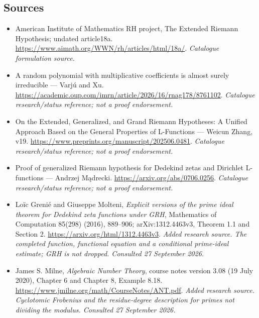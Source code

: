 \documentclass[11pt,a4paper]{article}
\begin{document}
\subsection{Sources}
\begin{itemize}\raggedright
\item[\textnormal{[S1]}]\hypertarget{source:statement:1}{} American Institute of Mathematics RH project, The Extended Riemann Hypothesis; undated article18a.
\url{https://www.aimath.org/WWN/rh/articles/html/18a/}.
{\small\textit{Catalogue formulation source.}}
\item[\textnormal{[S2]}]\hypertarget{source:statement:2}{} A random polynomial with multiplicative coefficients is almost surely irreducible — Varjú and Xu.
\url{https://academic.oup.com/imrn/article/2026/16/rnag178/8761102}.
{\small\textit{Catalogue research/status reference; not a proof endorsement.}}
\item[\textnormal{[S3]}]\hypertarget{source:statement:3}{} On the Extended, Generalized, and Grand Riemann Hypotheses: A Unified Approach Based on the General Properties of L-Functions — Weicun Zhang, v19.
\url{https://www.preprints.org/manuscript/202506.0481}.
{\small\textit{Catalogue research/status reference; not a proof endorsement.}}
\item[\textnormal{[S4]}]\hypertarget{source:statement:4}{} Proof of generalized Riemann hypothesis for Dedekind zetas and Dirichlet L-functions — Andrzej Mądrecki.
\url{https://arxiv.org/abs/0706.0256}.
{\small\textit{Catalogue research/status reference; not a proof endorsement.}}
\item[\textnormal{[E1]}]\hypertarget{extra:statement:1}{} Loïc Grenié and Giuseppe Molteni, \emph{Explicit versions of the prime ideal theorem for Dedekind zeta functions under GRH}, Mathematics of Computation 85(298) (2016), 889--906; arXiv:1312.4463v3, Theorem 1.1 and Section 2.
\url{https://arxiv.org/html/1312.4463v3}.
{\small\textit{Added research source. The completed function, functional equation and a conditional prime-ideal estimate; GRH is not dropped. Consulted 27 September 2026.}}
\item[\textnormal{[E2]}]\hypertarget{extra:statement:2}{} James S. Milne, \emph{Algebraic Number Theory}, course notes version 3.08 (19 July 2020), Chapter 6 and Chapter 8, Example 8.18.
\url{https://www.jmilne.org/math/CourseNotes/ANT.pdf}.
{\small\textit{Added research source. Cyclotomic Frobenius and the residue-degree description for primes not dividing the modulus. Consulted 27 September 2026.}}
\end{itemize}

\end{document}
